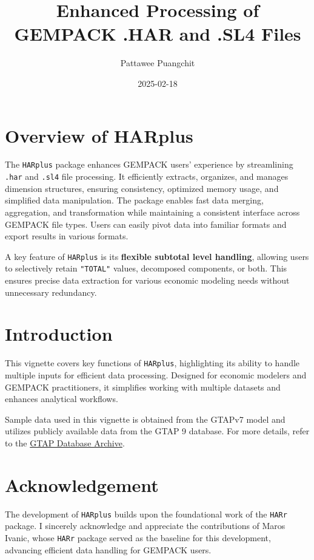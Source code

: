 \documentclass[
]{article}
\title{Enhanced Processing of GEMPACK .HAR and .SL4 Files}
\author{Pattawee Puangchit}
\date{2025-02-18}
\begin{document}
\maketitle

{
\setcounter{tocdepth}{2}
\tableofcontents
}
\section{Overview of HARplus}\label{overview-of-harplus}

The \texttt{HARplus} package enhances GEMPACK users' experience by
streamlining \texttt{.har} and \texttt{.sl4} file processing. It
efficiently extracts, organizes, and manages dimension structures,
ensuring consistency, optimized memory usage, and simplified data
manipulation. The package enables fast data merging, aggregation, and
transformation while maintaining a consistent interface across GEMPACK
file types. Users can easily pivot data into familiar formats and export
results in various formats.

A key feature of \texttt{HARplus} is its \textbf{flexible subtotal level
handling}, allowing users to selectively retain \texttt{"TOTAL"} values,
decomposed components, or both. This ensures precise data extraction for
various economic modeling needs without unnecessary redundancy.

\section{Introduction}\label{introduction}

This vignette covers key functions of \texttt{HARplus}, highlighting its
ability to handle multiple inputs for efficient data processing.
Designed for economic modelers and GEMPACK practitioners, it simplifies
working with multiple datasets and enhances analytical workflows.

Sample data used in this vignette is obtained from the GTAPv7 model and
utilizes publicly available data from the GTAP 9 database. For more
details, refer to the
\href{https://www.gtap.agecon.purdue.edu/databases/archives.asp}{GTAP
Database Archive}.

\section{Acknowledgement}\label{acknowledgement}

The development of \texttt{HARplus} builds upon the foundational work of
the \texttt{HARr} package. I sincerely acknowledge and appreciate the
contributions of Maros Ivanic, whose \texttt{HARr} package served as the
baseline for this development, advancing efficient data handling for
GEMPACK users.
\end{document}
